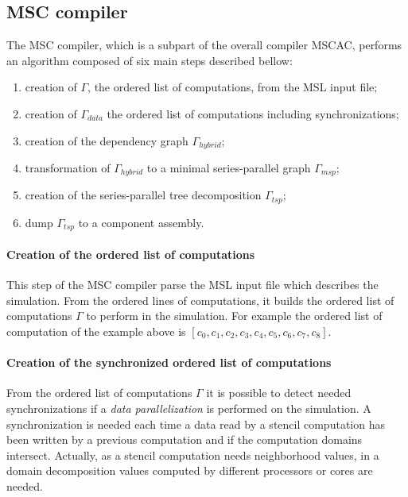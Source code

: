 \subsection{MSC compiler}
The MSC compiler, which is a subpart of the overall compiler MSCAC, performs an algorithm composed of six main steps described bellow:

\begin{enumerate}
\item creation of $\Gamma$, the ordered list of computations, from the MSL input file;
\item creation of $\Gamma_{data}$ the ordered list of computations including synchronizations;
\item creation of the dependency graph $\Gamma_{hybrid}$;
\item transformation of $\Gamma_{hybrid}$ to a minimal series-parallel graph $\Gamma_{msp}$;
\item creation of the series-parallel tree decomposition $\Gamma_{tsp}$;
\item dump $\Gamma_{tsp}$ to a component assembly.
\end{enumerate}

\paragraph{Creation of the ordered list of computations} This step of the MSC compiler parse the MSL input file which describes the simulation. From the ordered lines of computations, it builds the ordered list of computations $\Gamma$ to perform in the simulation. For example the ordered list of computation of the example above is $[c_0,c_1,c_2,c_3,c_4,c_5,c_6,c_7,c_8]$.

\paragraph{Creation of the synchronized ordered list of computations} From the ordered list of computations $\Gamma$ it is possible to detect needed synchronizations if a \emph{data parallelization} is performed on the simulation. A synchronization is needed each time a data read by a stencil computation has been written by a previous computation and if the computation domains intersect. Actually, as a stencil computation needs neighborhood values, in a domain decomposition values computed by different processors or cores are needed.

